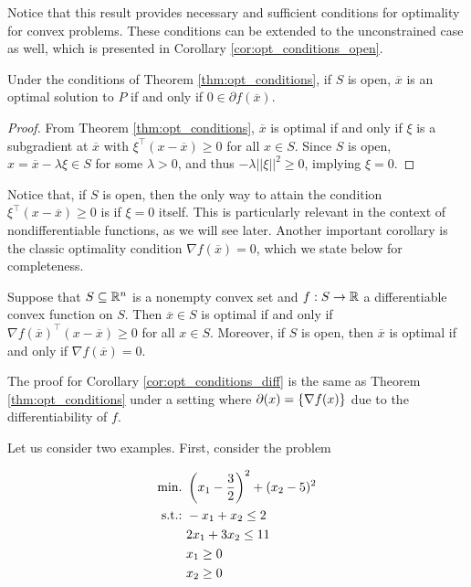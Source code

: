 Notice that this result provides necessary and sufficient conditions for optimality for convex problems. These conditions can be extended to the unconstrained case as well, which is presented in Corollary \ref{cor:opt_conditions_open}.
%
\begin{corollary} \label{cor:opt_conditions_open}
Under the conditions of Theorem \ref{thm:opt_conditions}, if $S$ is open, $\overline{x}$ is an optimal solution to $P$ if and only if $0 \in \partial f (\overline{x})$. 
\end{corollary}
%
\begin{proof}
From Theorem \ref{thm:opt_conditions}, $\overline{x}$ is optimal if and only if $\xi$ is a subgradient at $\overline{x}$ with $\xi^\top(x - \overline{x}) \geq 0$ for all $x \in S$. Since $S$ is open, $x = \overline{x} - \lambda\xi \in S$ for some $\lambda > 0$, and thus $-\lambda||\xi||^2 \geq 0$, implying $\xi = 0$.
\end{proof}
%
Notice that, if $S$ is open, then the only way to attain the condition $\xi^\top(x - \overline{x}) \geq 0$ is if $\xi = 0$ itself. This is particularly relevant in the context of nondifferentiable functions, as we will see later. Another important corollary is the classic optimality condition $\nabla f(\overline{x}) = 0$,  which we state below for completeness. 
%
\begin{corollary} \label{cor:opt_conditions_diff}
Suppose that $S \subseteq \mathbb{R}^n$ is a nonempty convex set and $f:S \rightarrow \mathbb{R}$ a differentiable convex function on $S$. Then $\overline{x} \in S$ is optimal if and only if $\nabla f(\overline{x})^\top (x - \overline{x}) \geq 0$ for all $x \in S$. Moreover, if $S$ is open, then $\overline{x}$ is optimal if and only if $\nabla f(\overline{x}) = 0$. 
\end{corollary}
%
The proof for Corollary \ref{cor:opt_conditions_diff} is the same as Theorem \ref{thm:opt_conditions} under a setting where $\partial (x) = \left\{ \nabla f(x) \right \}$ due to the differentiability of $f$.

Let us consider two examples. First, consider the problem

\begin{align*}
	\mathop{\text{min.~}} &\left(x_1 - \frac{3}{2}\right)^2 + (x_2 - 5)^2\\
	\mathop{\text{s.t.:~}} &-x_1 + x_2 \leq 2\\
	&2x_1 + 3x_2 \leq 11\\
	&x_1 \geq 0\\
	&x_2 \geq 0   
\end{align*}

